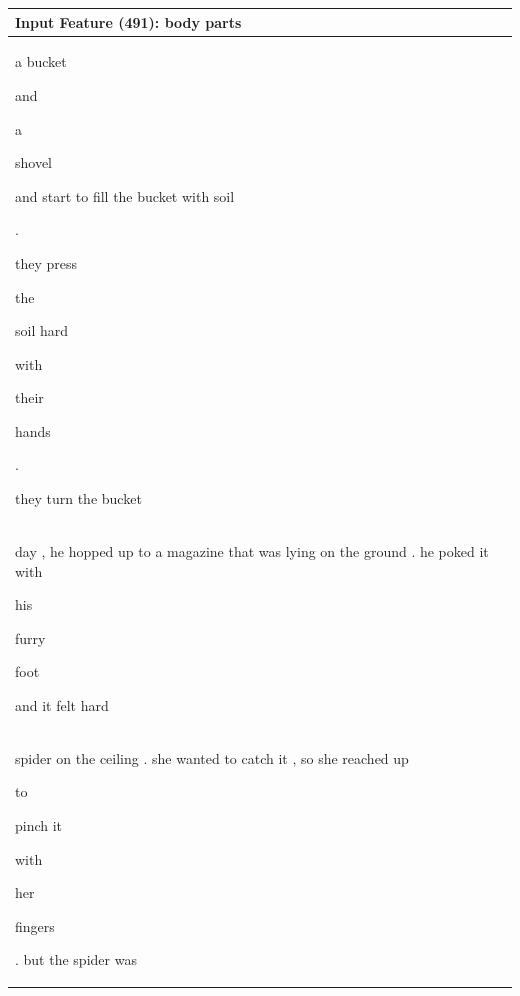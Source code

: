 \documentclass{article} %
\begin{document}
\begin{table}[h]
\begin{tabular}{|l|}
\hline
\hline
\normalsize \textbf{Input Feature (491): body parts} \\
\hline
a bucket \colorbox{rgb,255:red,225;green,236;blue,246}{\strut  and} \colorbox{rgb,255:red,216;green,231;blue,243}{\strut  a} \colorbox{rgb,255:red,228;green,238;blue,247}{\strut  shovel} and start to fill the bucket with soil \colorbox{rgb,255:red,238;green,245;blue,251}{\strut  .} they press \colorbox{rgb,255:red,211;green,229;blue,242}{\strut  the} soil hard \colorbox{rgb,255:red,189;green,219;blue,235}{\strut  with} \colorbox{rgb,255:red,106;green,130;blue,166}{\strut  their} \colorbox{rgb,255:red,158;green,201;blue,227}{\strut  hands} \colorbox{rgb,255:red,237;green,244;blue,250}{\strut  .} they turn the bucket \\ 
\hline 

day , he hopped up to a magazine that was lying on the ground . he poked it with \colorbox{rgb,255:red,106;green,130;blue,166}{\strut  his} \colorbox{rgb,255:red,113;green,159;blue,202}{\strut  furry} \colorbox{rgb,255:red,149;green,195;blue,223}{\strut  foot} and it felt hard \\ 
\hline 

spider on the ceiling . she wanted to catch it , so she reached up \colorbox{rgb,255:red,228;green,238;blue,247}{\strut  to} pinch it \colorbox{rgb,255:red,229;green,238;blue,247}{\strut  with} \colorbox{rgb,255:red,106;green,130;blue,166}{\strut  her} \colorbox{rgb,255:red,146;green,192;blue,222}{\strut  fingers} . but the spider was \\ 
\hline 


\end{tabular}
\end{table}
\end{document}
